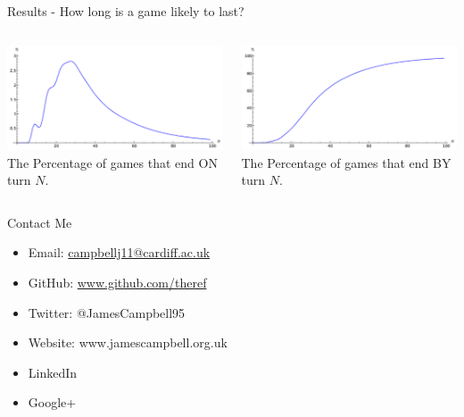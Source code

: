 \documentclass{beamer}
\begin{document}
\begin{frame}{Results - How long is a game likely to last?}
  \begin{columns}
      \begin{center}
      \includegraphics[width=\linewidth]{images/turns}\\
      The Percentage of games that end ON turn $N$.
      \end{center}
      \begin{center}
      \includegraphics[width=\linewidth]{images/sumturns}\\
      The Percentage of games that end BY turn $N$.
      \end{center}
  \end{columns}
\end{frame}

\begin{frame}{Contact Me}
  \begin{itemize}
    \itemsep2em
    \item Email: \href{mailto:campbellj11@cardiff.ac.uk}{campbellj11@cardiff.ac.uk}

    \item GitHub: \href{https://github.com/theref}{www.github.com/theref}

    \item Twitter: @JamesCampbell95

    \item Website: www.jamescampbell.org.uk

    \item LinkedIn 

    \item Google+
  \end{itemize}
\end{frame}
\end{document}
